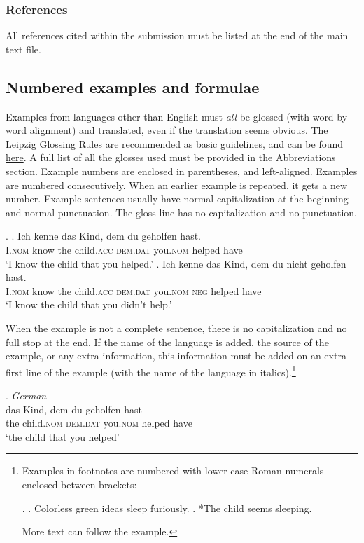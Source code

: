 \documentclass[charis,linguex,biblatex]{glossa}
\begin{document}
\subsubsection{References}
All references cited within the submission must be listed at the end of the main text file.

\subsection{Numbered examples and formulae}

Examples from languages other than English must \emph{all} be glossed (with word-by-word alignment) and translated, even if the translation seems obvious. The Leipzig Glossing Rules are recommended as basic guidelines, and can be found \href{http://www.eva.mpg.de/lingua/resources/glossing-rules.php}{here}. A full list of all the glosses used must be provided in the Abbreviations section. Example numbers are enclosed in parentheses, and left-aligned. Examples are numbered consecutively. When an earlier example is repeated, it gets a new number. Example sentences usually have normal capitalization at the beginning and normal punctuation. The gloss line has no capitalization and no punctuation. 

\ex. \ag. Ich   kenne das Kind, dem du geholfen hast.\\
I.\textsc{nom} know the child.\textsc{acc} \textsc{dem.dat} you.\textsc{nom} helped have\\
\glt `I know the child that you helped.'
\bg. Ich kenne das Kind, dem du nicht geholfen hast. \\
I.\textsc{nom} know  the child.\textsc{acc} \textsc{dem.dat} you.\textsc{nom} \textsc{neg} helped   have\\
\glt `I know the child that you didn’t help.’

When the example is not a complete sentence, there is no capitalization and no full stop at the end. If the name of the language is added, the source of the example, or any extra information, this information must be added on an extra first line of the example (with the name of the language in italics).\footnote{Examples in footnotes are numbered with lower case Roman numerals enclosed between brackets:

\ex.
\a. Colorless green ideas sleep furiously.
\b. *The child seems sleeping.

More text can follow the example.}

\ex. \textit{German} \citep{coetsem:2000}\\ %
\gll das Kind, dem du geholfen hast\\  %
the child.\textsc{nom} \textsc{dem.dat} you.\textsc{nom}  helped have\\ %
\glt `the child that you helped' %
\end{document}
